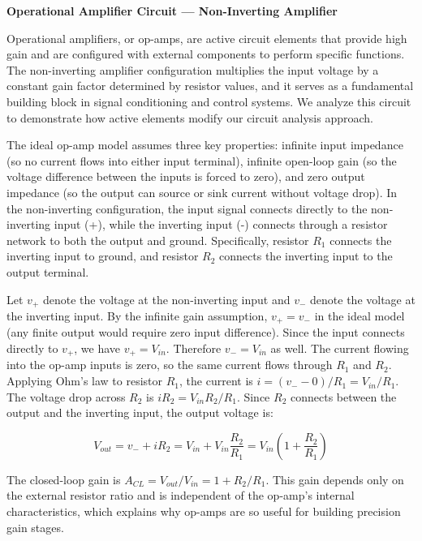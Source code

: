 \begin{example}
\textbf{Operational Amplifier Circuit — Non-Inverting Amplifier}

Operational amplifiers, or op-amps, are active circuit elements that provide high gain and are configured with external components to perform specific functions. The non-inverting amplifier configuration multiplies the input voltage by a constant gain factor determined by resistor values, and it serves as a fundamental building block in signal conditioning and control systems. We analyze this circuit to demonstrate how active elements modify our circuit analysis approach.

The ideal op-amp model assumes three key properties: infinite input impedance (so no current flows into either input terminal), infinite open-loop gain (so the voltage difference between the inputs is forced to zero), and zero output impedance (so the output can source or sink current without voltage drop). In the non-inverting configuration, the input signal connects directly to the non-inverting input (+), while the inverting input (-) connects through a resistor network to both the output and ground. Specifically, resistor $R_1$ connects the inverting input to ground, and resistor $R_2$ connects the inverting input to the output terminal.

Let $v_+$ denote the voltage at the non-inverting input and $v_-$ denote the voltage at the inverting input. By the infinite gain assumption, $v_+ = v_-$ in the ideal model (any finite output would require zero input difference). Since the input connects directly to $v_+$, we have $v_+ = V_{in}$. Therefore $v_- = V_{in}$ as well. The current flowing into the op-amp inputs is zero, so the same current flows through $R_1$ and $R_2$. Applying Ohm's law to resistor $R_1$, the current is $i = (v_- - 0)/R_1 = V_{in}/R_1$. The voltage drop across $R_2$ is $i R_2 = V_{in} R_2 / R_1$. Since $R_2$ connects between the output and the inverting input, the output voltage is:

\begin{equation}
V_{out} = v_- + i R_2 = V_{in} + V_{in} \frac{R_2}{R_1} = V_{in} \left(1 + \frac{R_2}{R_1}\right)
\end{equation}

The closed-loop gain is $A_{CL} = V_{out}/V_{in} = 1 + R_2/R_1$. This gain depends only on the external resistor ratio and is independent of the op-amp's internal characteristics, which explains why op-amps are so useful for building precision gain stages.


\end{example}
